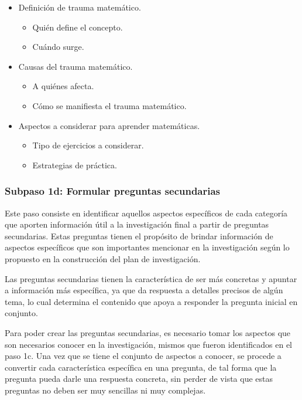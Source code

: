 \begin{itemize}
  \item Definición de trauma matemático.
    \begin{itemize}
      \item Quién define el concepto.
      \item Cuándo surge.
    \end{itemize}
  \item Causas del trauma matemático.
    \begin{itemize}
      \item A quiénes afecta.
      \item Cómo se manifiesta el trauma matemático.
    \end{itemize}
  \item Aspectos a considerar para aprender matemáticas.
    \begin{itemize}
      \item Tipo de ejercicios a considerar.
      \item Estrategias de práctica.
    \end{itemize}
\end{itemize}


\subsubsection{Subpaso 1d: Formular preguntas secundarias}
\label{secPaso1dCap2}

Este paso consiste en identificar aquellos aspectos específicos de cada categoría que aporten información útil a la investigación final a partir de preguntas secundarias. Estas preguntas tienen el propósito de brindar información de aspectos específicos que son importantes mencionar en la investigación según lo propuesto en la construcción del plan de investigación.

Las preguntas secundarias tienen la característica de ser más concretas y apuntar a información más específica, ya que da respuesta a detalles precisos de algún tema, lo cual determina el contenido que apoya a responder la pregunta inicial en conjunto.

Para poder crear las preguntas secundarias, es necesario tomar los aspectos que son necesarios conocer en la investigación, mismos que fueron identificados en el paso 1c. Una vez que se tiene el conjunto de aspectos a conocer, se procede a convertir cada característica específica en una pregunta, de tal forma que la pregunta pueda darle una respuesta concreta, sin perder de vista que estas preguntas no deben ser muy sencillas ni muy complejas.


